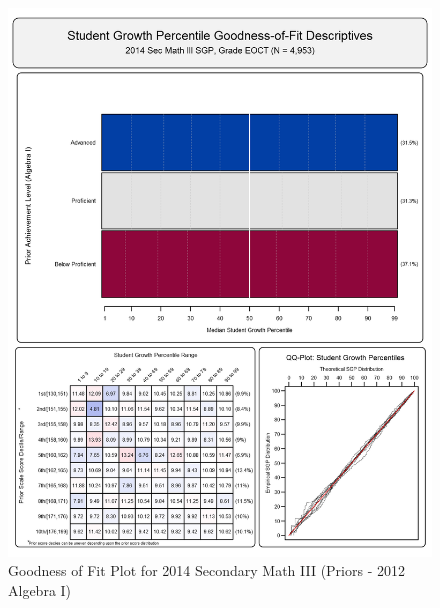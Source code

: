 \documentclass[12pt]{article}
\begin{document}
\begin{figure}[htbp]
\centering
\includegraphics{../img/Goodness_of_Fit/SEC_MATH_III.2014/2014_SEC_MATH_III_EOCT;2012_ALGEBRA_I_EOCT.png}
\caption{Goodness of Fit Plot for 2014 Secondary Math III (Priors - 2012
Algebra I)}
\end{figure}
\end{document}
